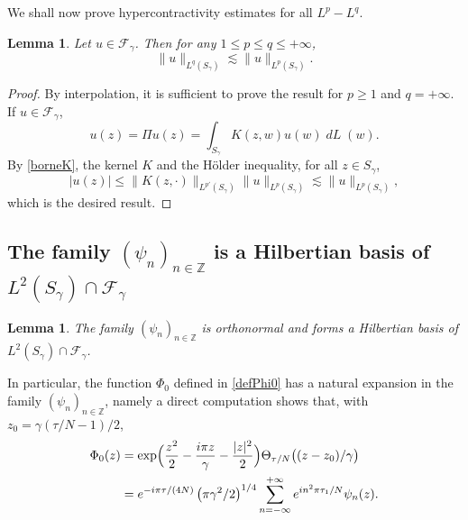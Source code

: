 \documentclass[10pt]{amsart}
\DeclareMathOperator{\dL}{\mathit{dL}}
\newtheorem{lemme}[theorem]{Lemma}
\theoremstyle{definition}
\let\EE\exp
\newcommand\Z{\mathbb Z}
\newcommand{\pa}[1]{\left(#1\right)}
\let\Subsection\subsection\let\Subsubsection\subsubsection
\begin{document}
We shall now prove hypercontractivity estimates for all $L^p-L^q$.
\begin{lemme}
Let $u\in \mathcal{F}_{\gamma}$. Then for any $1 \leq p \leq q \leq +\infty$,
\begin{equation}\label{Carlen_bande}
\|u\|_{L^{q}(S_{\gamma})} \lesssim \|u\|_{L^{p}(S_{\gamma})}.
\end{equation}
\end{lemme}

\begin{proof}
By interpolation, it is sufficient to prove the result for $p \geq 1$ and $q= +\infty$. If $u\in \mathcal{F}_\gamma$,
\[
u(z)= \Pi u(z)=\int_{S_\gamma} K(z,w) u(w) \dL(w).
\]
By \eqref{borneK}, the kernel $K$ and the Hölder inequality, for all $z \in S_{\gamma}$,
\[
|u(z)|\leq \| K(z, \cdot)\|_{L^{p'}(S_{\gamma})} \| u\|_{L^p(S_{\gamma})} \lesssim \|u\|_{L^p(S_{\gamma})},
\]
which is the desired result.
\end{proof}

\Subsection{The family $(\psi_n)_{n \in \Z}$ is a Hilbertian basis of $L^2(S_\gamma) \cap \mathcal{F}_\gamma$}

\begin{lemme}\label{lem98}
The family $(\psi_n)_{n \in \Z}$ is orthonormal and forms a Hilbertian basis of $L^2(S_\gamma) \cap \mathcal{F}_\gamma$.
\end{lemme}

In particular, the function $\Phi_0$ defined in \eqref{defPhi0} has a natural expansion in the family $(\psi_n)_{n \in \Z}$, namely a direct computation shows that, with $z_0={\gamma}({\tau}/N-1)/2$,
\begin{align}\label{exp1}
\Phi_{0}(z)&=\EE\Bigl(\frac{z^2}2 -\frac{i\pi z} {\gamma} - \frac{|z|^2}2\Bigr) \Theta_{{\tau}/{N}}\bigl((z-z_{0})/\gamma\bigr) \nonumber \\
&= e^{-i{\pi \tau}/{(4N)}}\pa{{\pi\gamma^2}/{2}}^{1/4}\sum_{n=-\infty}^{+\infty} e^{i{n^2\pi\tau_1}/{N}}\psi_n(z).
\end{align}
\end{document}

